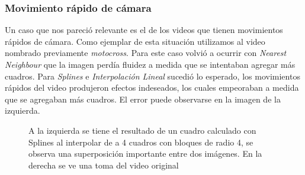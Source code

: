 \subsubsection{Movimiento rápido de cámara}

Un caso que nos pareció relevante es el de los videos que tienen movimientos rápidos de cámara. Como ejemplar de esta situación utilizamos al video nombrado previamente \textit{motocross}. Para este caso volvió a ocurrir con \textit{Nearest Neighbour} que la imagen perdía fluidez a medida que se intentaban agregar más cuadros. Para  \textit{Splines} e \textit{Interpolación Lineal}  sucedió lo esperado, los movimientos rápidos del video produjeron efectos indeseados, los cuales empeoraban a medida que se agregaban más cuadros. El error puede observarse en la imagen de la izquierda.

\begin{figure}[H]
\centering
\begin{minipage}{0.48\textwidth}
\end{minipage}%
\hfill
\begin{minipage}{0.48\textwidth}   

\end{minipage}
\caption{\footnotesize A la izquierda se tiene el resultado de un cuadro calculado con Splines al interpolar de a 4 cuadros con bloques de radio 4, se observa una superposición importante entre dos imágenes. En la derecha se ve una toma del video original}
\end{figure}

